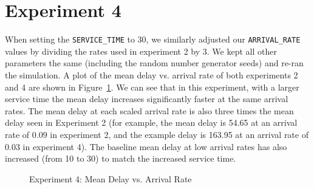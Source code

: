 \section*{Experiment 4}
When setting the \texttt{SERVICE\_TIME} to 30, we similarly adjusted our \texttt{ARRIVAL\_RATE} values by dividing the rates used in experiment 2 by 3. We kept all other parameters the same (including the random number generator seeds) and re-ran the simulation. A plot of the mean delay vs. arrival rate of both experiments 2 and 4 are shown in Figure~\ref{fig:exp4}. We can see that in this experiment, with a larger service time the mean delay increases significantly faster at the same arrival rates. The mean delay at each scaled arrival rate is also three times the mean delay seen in Experiment 2 (for example, the mean delay is 54.65 at an arrival rate of 0.09 in experiment 2, and the example delay is 163.95 at an arrival rate of 0.03 in experiment 4). The baseline mean delay at low arrival rates has also increased (from 10 to 30) to match the increased service time.

\begin{figure}[h]
\centering
{}
\caption{Experiment 4: Mean Delay vs. Arrival Rate}
\label{fig:exp4}
\end{figure}